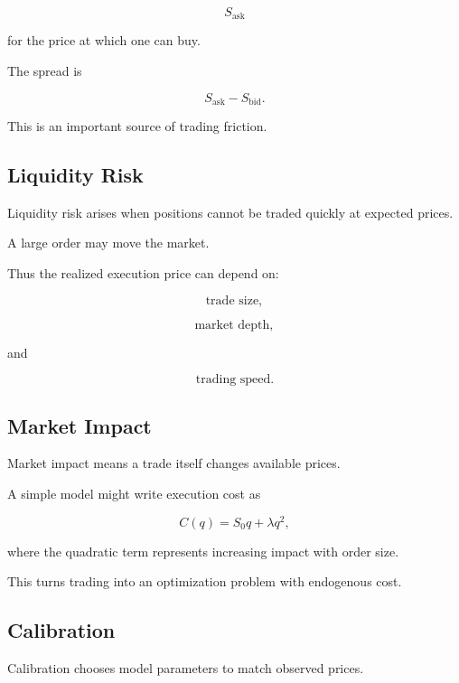 \[
\boxed{
S_{\mathrm{ask}}
}
\]

for the price at which one can buy.

The spread is

\[
\boxed{
S_{\mathrm{ask}}
-
S_{\mathrm{bid}}.
}
\]

This is an important source of trading friction.

\subsection{Liquidity Risk}
\label{subsec:liquidity-risk}

Liquidity risk arises when positions cannot be traded quickly at expected
prices.

A large order may move the market.

Thus the realized execution price can depend on:

\[
\boxed{
\text{trade size},
}
\]

\[
\boxed{
\text{market depth},
}
\]

and

\[
\boxed{
\text{trading speed}.
}
\]

\subsection{Market Impact}
\label{subsec:market-impact}

Market impact means a trade itself changes available prices.

A simple model might write execution cost as

\[
\boxed{
C(q)
=
S_0q
+
\lambda q^2,
}
\]

where the quadratic term represents increasing impact with order size.

This turns trading into an optimization problem with endogenous cost.

\subsection{Calibration}
\label{subsec:financial-calibration}

Calibration chooses model parameters to match observed prices.

